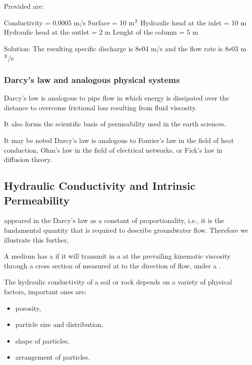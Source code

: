 \documentclass[letterpaper,10pt,english]{sphinxmanual}
\begin{document}
\begin{sphinxVerbatim}[commandchars=\\\{\}]
Provided are:

Conductivity = 0.0005 m/s
Surface = 10 m\(\sp{\text{2}}\)
Hydraulic head at the inlet = 10 m
Hydraulic head at the outlet = 2 m
Lenght of the column = 5 m 

Solution:
The resulting specific discharge is 8e\PYGZhy{}04 m/s 
and the flow rate is 8e\PYGZhy{}03 m\(\sp{\text{3}}\)/s
\end{sphinxVerbatim}


\subsubsection{Darcy’s law and analogous physical systems}
\label{\detokenize{contents/flow/lecture_04/14_darcy_law_K:darcy-s-law-and-analogous-physical-systems}}
Darcy’s law is analogous to pipe flow in which energy is dissipated over the distance to overcome frictional loss resulting
from fluid viscosity.

It also forms the scientific basis of permeability used in the earth
sciences.

It may be noted Darcy’s law is analogous to Fourier’s law in the field of heat conduction, Ohm’s law in the field of electrical networks, or Fick’s law in diffusion theory.


\subsection{Hydraulic Conductivity and Intrinsic Permeability}
\label{\detokenize{contents/flow/lecture_04/14_darcy_law_K:hydraulic-conductivity-and-intrinsic-permeability}}
 appeared in the Darcy’s law as a constant of proportionality, i.e., it is the fundamental quantity that is required to describe groundwater flow. Therefore we illustrate this further,

A medium has a  if it will transmit in  a  at the prevailing kinematic viscosity through a cross section of  measured at  to the direction of flow, under a .

The hydraulic conductivity of a soil or rock depends on a variety of
physical factors, important ones are:
\begin{itemize}
\item {} 
porosity,

\item {} 
particle size and distribution,

\item {} 
shape of particles,

\item {} 
arrangement of particles.

\end{itemize}
\end{document}
